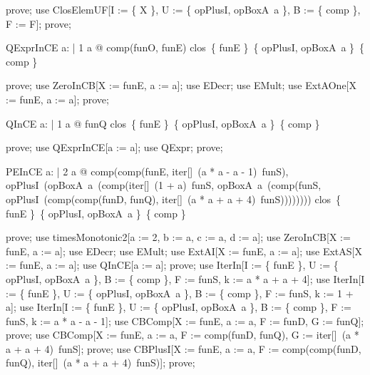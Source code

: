 \documentclass{article}
\begin{document}

\begin{zproof}
prove;
use ClosElemUF[I := \{ X \}, U := \{ opPlusI, opBoxA~a \}, B := \{ comp \}, F := F];
prove;
\end{zproof}

\begin{theorem}{QExprInCE}
  \forall a: \nat | 1 \leq a @ comp(funO, funE) \in clos~\{ funE \}~\{ opPlusI, opBoxA~a \}~\{ comp \}
\end{theorem}

\begin{zproof}
prove;
use ZeroInCB[X := funE, a := a];
use EDecr;
use EMult;
use ExtAOne[X := funE, a := a];
prove;
\end{zproof}

\begin{theorem}{QInCE}
  \forall a: \nat | 1 \leq a @ funQ \in clos~\{ funE \}~\{ opPlusI, opBoxA~a \}~\{ comp \}
\end{theorem}

\begin{zproof}
prove;
use QExprInCE[a := a];
use QExpr;
prove;
\end{zproof}

\begin{theorem}{PEInCE}
  \forall a: \nat | 2 \leq a @ comp(comp(funE, iter[\nat]~(a * a - a - 1)~funS), opPlusI~(opBoxA~a~(comp(iter[\nat]~(1 + a)~funS, opBoxA~a~(comp(funS, opPlusI~(comp(comp(funD, funQ), iter[\nat]~(a * a + a + 4)~funS)))))))) \in clos~\{ funE \}~\{ opPlusI, opBoxA~a \}~\{ comp \}
\end{theorem}

\begin{zproof}
prove;
use timesMonotonic2[a := 2, b := a, c := a, d := a];
use ZeroInCB[X := funE, a := a];
use EDecr;
use EMult;
use ExtAI[X := funE, a := a];
use ExtAS[X := funE, a := a];
use QInCE[a := a];
prove;
use IterIn[I := \{ funE \}, U := \{ opPlusI, opBoxA~a \}, B := \{ comp \}, F := funS, k := a * a + a + 4];
use IterIn[I := \{ funE \}, U := \{ opPlusI, opBoxA~a \}, B := \{ comp \}, F := funS, k := 1 + a];
use IterIn[I := \{ funE \}, U := \{ opPlusI, opBoxA~a \}, B := \{ comp \}, F := funS, k := a * a - a - 1];
use CBComp[X := funE, a := a, F := funD, G := funQ];
prove;
use CBComp[X := funE, a := a, F := comp(funD, funQ), G := iter[\nat]~(a * a + a + 4)~funS];
prove;
use CBPlusI[X := funE, a := a, F := comp(comp(funD, funQ), iter[\nat]~(a * a + a + 4)~funS)];
prove;
\end{zproof}
\end{document}
